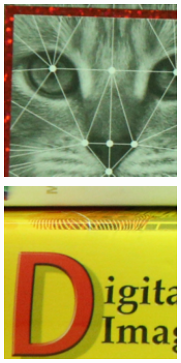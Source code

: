 \begin{figure}
\begin{subfigure}[t]{0.19\textwidth}
    \end{subfigure}
    \hfill
    \begin{subfigure}[t]{0.19\textwidth}
        \centering
        \includegraphics[width=1\textwidth]{images/guided/resize_CC_Noisy_Canon_EOS_5D_Mark3_ISO_3200_C3_26.png}
    \end{subfigure}
    \hfill
    \begin{subfigure}[t]{0.19\textwidth}
        \centering
        \includegraphics[width=1\textwidth]{images/guided/resize_CC_Noisy_Canon_EOS_5D_Mark3_ISO_3200_C3_73.png}

\end{subfigure}
\end{figure}
